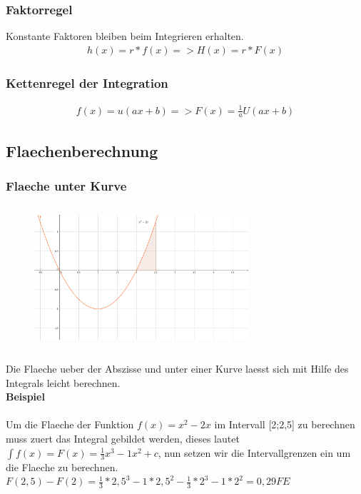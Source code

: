 \documentclass[a4paper]{article} %
\begin{document}
	\subsubsection{Faktorregel}
	Konstante Faktoren bleiben beim Integrieren erhalten.
	\begin{align*}
	h(x) = r * f(x) => H(x)=r*F(x)
	\end{align*}
	\subsubsection{Kettenregel der Integration}

	\begin{align*}
	f(x)=u(ax+b)=> F(x)=\frac{1}{a}U(ax+b)
	\end{align*}
	\subsection{Flaechenberechnung}
	\subsubsection{Flaeche unter Kurve}

	\begin{minipage}{0.3\textwidth}
	\begin{figure}[H]
	\includegraphics[width=300px, height=200px]{Integral_1.png}
	\caption{}
	\end{figure}
	\end{minipage} \hfill

	\begin{minipage}{0.5\textwidth}
	Die Flaeche ueber der Abszisse und unter einer Kurve laesst sich mit Hilfe des Integrals leicht berechnen.\\
	\textbf{Beispiel}\\\\
	Um die Flaeche der Funktion $f(x)=x^2-2x$ im Intervall [2;2,5] zu berechnen muss zuert das Integral gebildet werden,
	dieses lautet $\int f(x)=F(x)=\frac{1}{3}x^3-1x^2+c$, nun setzen wir die Intervallgrenzen ein um die Flaeche zu berechnen.\\
	$F(2,5)-F(2)=\frac{1}{3}*2,5^3-1*2,5^2-\frac{1}{3}*2^3-1*2^2=0,29FE$

	\end{minipage}
\end{document}
